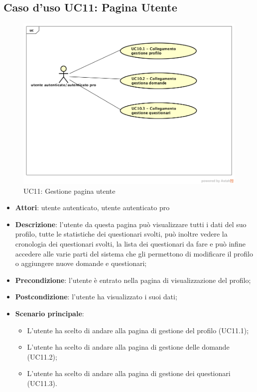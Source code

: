 \subsection{Caso d'uso UC11: Pagina Utente}

\label{UC11}
\begin{figure}
	\centering
	\includegraphics[scale=0.5]{UML/UC11.png}
	\caption{UC11: Gestione pagina utente}
\end{figure}

\begin{itemize}
\item\textbf{Attori}: utente autenticato, utente autenticato pro
\item\textbf{Descrizione}: l'utente da questa pagina può visualizzare tutti i dati del suo profilo, tutte le statistiche dei questionari svolti, può inoltre vedere la cronologia dei questionari svolti, la lista dei questionari da fare e può infine accedere alle varie parti del sistema che gli permettono di modificare il profilo o aggiungere nuove domande e questionari;
\item\textbf{Precondizione}: l'utente è entrato nella pagina di visualizzazione del profilo;
\item\textbf{Postcondizione}: l'utente ha visualizzato i suoi dati;
\item\textbf{Scenario principale}:
\begin{itemize}
\item L'utente ha scelto di andare alla pagina di gestione del profilo (UC11.1);
\item L'utente ha scelto di andare alla pagina di gestione delle domande (UC11.2);  
\item L'utente ha scelto di andare alla pagina di gestione dei questionari (UC11.3).
\end{itemize}
\end{itemize}

